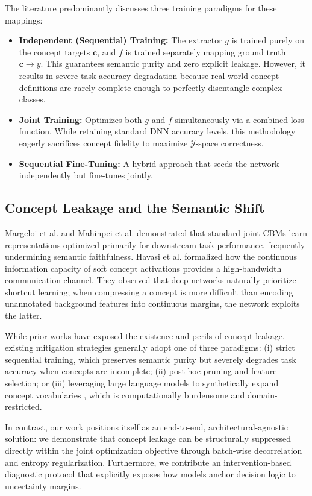 \documentclass[times,twocolumn,final]{elsarticle}
\begin{document}
The literature predominantly discusses three training paradigms for these mappings:
\begin{itemize}
    \item \textbf{Independent (Sequential) Training:} The extractor $g$ is trained purely on the concept targets $\boldsymbol{c}$, and $f$ is trained separately mapping ground truth $\boldsymbol{c} \rightarrow y$. This guarantees semantic purity and zero explicit leakage. However, it results in severe task accuracy degradation because real-world concept definitions are rarely complete enough to perfectly disentangle complex classes.
    \item \textbf{Joint Training:} Optimizes both $g$ and $f$ simultaneously via a combined loss function. While retaining standard DNN accuracy levels, this methodology eagerly sacrifices concept fidelity to maximize $\mathcal{Y}$-space correctness.
    \item \textbf{Sequential Fine-Tuning:} A hybrid approach that seeds the network independently but fine-tunes jointly.
\end{itemize}

\subsection{Concept Leakage and the Semantic Shift}
Margeloi et al. \citep{margeloi2021do} and Mahinpei et al. \citep{mahinpei2021promises} demonstrated that standard joint CBMs learn representations optimized primarily for downstream task performance, frequently undermining semantic faithfulness. Havasi et al. \citep{havasi2022addressing} formalized how the continuous information capacity of soft concept activations provides a high-bandwidth communication channel. They observed that deep networks naturally prioritize shortcut learning; when compressing a concept is more difficult than encoding unannotated background features into continuous margins, the network exploits the latter. 

While prior works have exposed the existence and perils of concept leakage, existing mitigation strategies generally adopt one of three paradigms: (i) strict sequential training, which preserves semantic purity but severely degrades task accuracy when concepts are incomplete; (ii) post-hoc pruning and feature selection; or (iii) leveraging large language models to synthetically expand concept vocabularies \citep{oikarinen2023label}, which is computationally burdensome and domain-restricted. 

In contrast, our work positions itself as an end-to-end, architectural-agnostic solution: we demonstrate that concept leakage can be structurally suppressed directly within the joint optimization objective through batch-wise decorrelation and entropy regularization. Furthermore, we contribute an intervention-based diagnostic protocol that explicitly exposes how models anchor decision logic to uncertainty margins.
\end{document}
